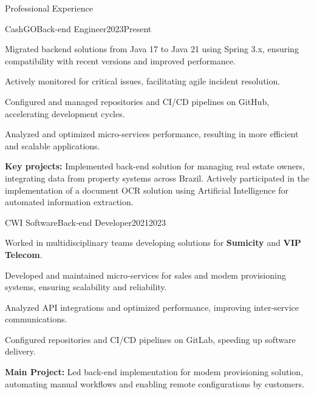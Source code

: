 \documentclass{domingosfelipe-resume}
\begin{document}

    \begin{rSection}{Professional Experience}
    \begin{rExperienceSubsection}{CashGO}{Back-end Engineer}{2023}{Present}
        \item Migrated backend solutions from Java 17 to Java 21 using Spring 3.x, ensuring compatibility with recent versions and improved performance.
        \item Actively monitored for critical issues, facilitating agile incident resolution.
        \item Configured and managed repositories and CI/CD pipelines on GitHub, accelerating development cycles.
        \item Analyzed and optimized micro-services performance, resulting in more efficient and scalable applications.
        \item \textbf{Key projects:} Implemented back-end solution for managing real estate owners, integrating data from property systems across Brazil. Actively participated in the implementation of a document OCR solution using Artificial Intelligence for automated information extraction.
    \end{rExperienceSubsection}

    \begin{rExperienceSubsection}{CWI Software}{Back-end Developer}{2021}{2023}
        \item Worked in multidisciplinary teams developing solutions for \textbf{Sumicity} and \textbf{VIP Telecom}.
        \item Developed and maintained micro-services for sales and modem provisioning systems, ensuring scalability and reliability.
        \item Analyzed API integrations and optimized performance, improving inter-service communications.
        \item Configured repositories and CI/CD pipelines on GitLab, speeding up software delivery.
        \item \textbf{Main Project:} Led back-end implementation for modem provisioning solution, automating manual workflows and enabling remote configurations by customers.
    \end{rExperienceSubsection}


\end{rSection}
\end{document}
